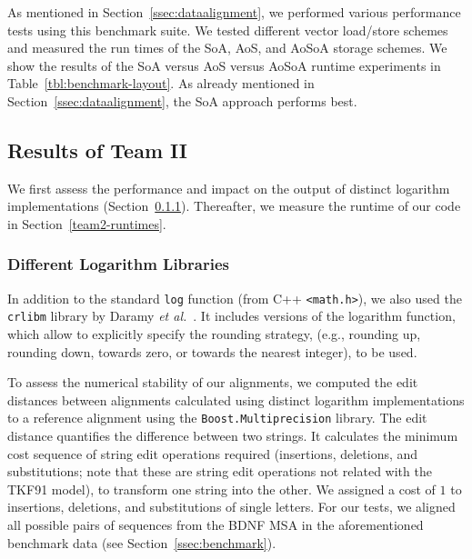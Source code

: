 \documentclass[runningheads,a4paper]{llncs}
\begin{document}
As mentioned in Section~\ref{ssec:dataalignment}, we performed various performance tests using this benchmark suite.
We tested different vector load/store schemes and measured the run times of the SoA, AoS, and AoSoA storage schemes.
We show the results of the SoA versus AoS versus AoSoA runtime experiments in Table~\ref{tbl:benchmark-layout}.
As already mentioned in Section~\ref{ssec:dataalignment}, the SoA approach performs best.





\subsection{Results of Team II}
\label{res-team-2}
We first assess the performance and impact on the output of distinct logarithm implementations (Section~\ref{sec:crlibm}).
Thereafter, we measure the runtime of our code in Section~\ref{team2-runtimes}.


\subsubsection{Different Logarithm Libraries}
\label{sec:crlibm}

In addition to the standard \texttt{log} function (from C++ \texttt{<math.h>}),
we also used the \texttt{crlibm} library by Daramy {\em et al.}~\cite{Daramy04}.
It includes versions of the logarithm function, which allow to explicitly specify the rounding strategy, (e.g., rounding up, rounding down, towards zero, or towards the nearest integer), to be used.

To assess the numerical stability of our alignments,  we computed the edit distances between alignments calculated using distinct logarithm implementations 
to a reference alignment using the \texttt{Boost.Multiprecision} library.
The edit distance quantifies the difference between two strings. It calculates the minimum cost sequence of string edit operations required 
(insertions, deletions, and substitutions; note that these are string edit operations not related with the TKF91 model), 
to transform one string into the other. We assigned a cost of $1$ to insertions, deletions, and substitutions of single letters.
For our tests, we aligned all possible pairs of sequences from the BDNF MSA in the aforementioned benchmark data (see Section~\ref{ssec:benchmark}).
\end{document}
